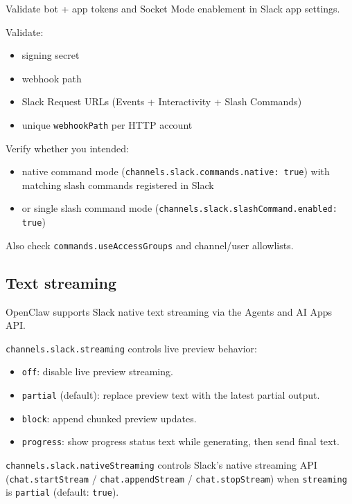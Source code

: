 Validate bot + app tokens and Socket Mode enablement in Slack app settings.

Validate:

\begin{itemize}
  \item signing secret
  \item webhook path
  \item Slack Request URLs (Events + Interactivity + Slash Commands)
  \item unique \texttt{webhookPath} per HTTP account
\end{itemize}



Verify whether you intended:

\begin{itemize}
  \item native command mode (\texttt{channels.slack.commands.native: true}) with matching slash commands registered in Slack
  \item or single slash command mode (\texttt{channels.slack.slashCommand.enabled: true})
\end{itemize}


Also check \texttt{commands.useAccessGroups} and channel/user allowlists.


\subsection{Text streaming}


OpenClaw supports Slack native text streaming via the Agents and AI Apps API.

\texttt{channels.slack.streaming} controls live preview behavior:

\begin{itemize}
  \item \texttt{off}: disable live preview streaming.
  \item \texttt{partial} (default): replace preview text with the latest partial output.
  \item \texttt{block}: append chunked preview updates.
  \item \texttt{progress}: show progress status text while generating, then send final text.
\end{itemize}


\texttt{channels.slack.nativeStreaming} controls Slack's native streaming API (\texttt{chat.startStream} / \texttt{chat.appendStream} / \texttt{chat.stopStream}) when \texttt{streaming} is \texttt{partial} (default: \texttt{true}).

